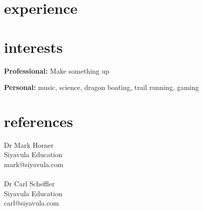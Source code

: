 \documentclass[]{friggeri-cv} %
\begin{document}

\section{experience}
\begin{entrylist}
\end{entrylist}

\section{interests}

\textbf{Professional:} Make something up

\textbf{Personal:} music, science, dragon boating, trail running, gaming


\section{references}

Dr Mark Horner\\
Siyavula Education\\
mark@siyavula.com\\
\\
Dr Carl Scheffler\\
Siyavula Education\\
carl@siyavula.com\\
\end{document}
